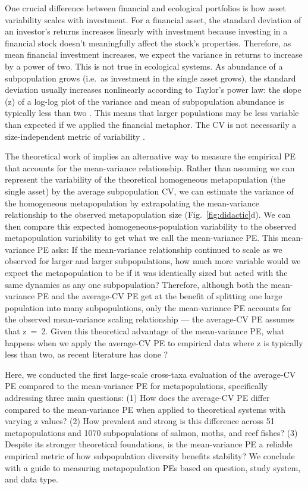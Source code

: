 One crucial difference between financial and ecological portfolios is how asset
variability scales with investment. For a financial asset, the standard
deviation of an investor's returns increases linearly with investment because
investing in a financial stock doesn't meaningfully affect the stock's
properties. Therefore, as mean financial investment increases, we expect the
variance in returns to increase by a power of two. This is not true in
ecological systems. As abundance of a subpopulation grows (i.e.\ as investment
in the single asset grows), the standard deviation usually increases
nonlinearly according to Taylor's power law: the slope (z) of a log-log plot of
the variance and mean of subpopulation abundance is typically less than two
\citep{taylor1980,taylor1982}. This means that larger populations may
be less variable than expected if we applied the financial metaphor. The
CV is not necessarily a size-independent metric of variability
\citep{mcardle1990}.

The theoretical work of \citet{tilman1998} implies an alternative way to
measure the empirical PE that accounts for the mean-variance relationship.
Rather than assuming we can represent the variability of the theoretical
homogeneous metapopulation (the single asset) by the average subpopulation CV,
we can estimate the variance of the homogeneous metapopulation by extrapolating
the mean-variance relationship to the observed metapopulation size
(Fig.~\ref{fig:didactic}d). We can then compare this expected
homogeneous-population variability to the observed metapopulation variability
to get what we call the mean-variance PE. This mean-variance PE asks: If the
mean-variance relationship continued to scale as we observed for larger and
larger subpopulations, how much more variable would we expect the
metapopulation to be if it was identically sized but acted with the same
dynamics as any one subpopulation? Therefore, although both the mean-variance
PE and the average-CV PE get at the benefit of splitting one large population
into many subpopulations, only the mean-variance PE accounts for the observed
mean-variance scaling relationship --- the average-CV PE assumes that z~=~2.
Given this theoretical advantage of the mean-variance PE, what happens when we
apply the average-CV PE to empirical data where z is typically less than two,
as recent literature has done \citep{secor2009, schindler2010,
  carlson2011}?

Here, we conducted the first large-scale cross-taxa evaluation of the
average-CV PE compared to the mean-variance PE for metapopulations,
specifically addressing three main questions: (1) How does the average-CV PE
differ compared to the mean-variance PE when applied to theoretical systems
with varying z values? (2) How prevalent and strong is this difference across
51 metapopulations and 1070 subpopulations of
salmon, moths, and reef fishes? (3) Despite its stronger theoretical
foundations, is the mean-variance PE a reliable empirical metric of how
subpopulation diversity benefits stability? We conclude with a guide to
measuring metapopulation PEs based on question, study system, and data type.

